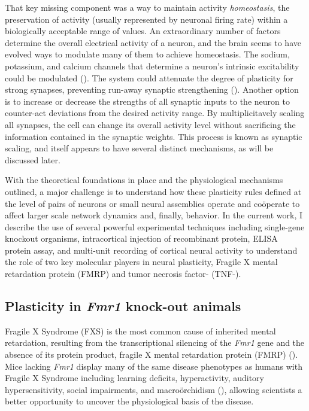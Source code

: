That key missing component was a way to maintain activity \textit{homeostasis}, the preservation of activity (usually represented by neuronal firing rate) within a biologically acceptable range of values. An extraordinary number of factors determine the overall electrical activity of a neuron, and the brain seems to have evolved ways to modulate many of them to achieve homeostasis. The sodium, potassium, and calcium channels that determine a neuron's intrinsic excitability could be modulated (\cite{Franklin1992}). The system could attenuate the degree of plasticity for strong synapses, preventing run-away synaptic strengthening (\cite{VanRossum2000}). Another option is to increase or decrease the strengths of all synaptic inputs to the neuron to counter-act deviations from the desired activity range. By multiplicitavely scaling all synapses, the cell can change its overall activity level without sacrificing the information contained in the synaptic weights. This process is known as synaptic scaling, and itself appears to have several distinct mechanisms, as will be discussed later.

With the theoretical foundations in place and the physiological mechanisms outlined, a major challenge is to understand how these plasticity rules defined at the level of pairs of neurons or small neural assemblies operate and co\"operate to affect larger scale network dynamics and, finally, behavior. In the current work, I describe the use of several powerful experimental techniques including single-gene knockout organisms, intracortical injection of recombinant protein, ELISA protein assay, and multi-unit recording of cortical neural activity to understand the role of two key molecular players in neural plasticity, Fragile X mental retardation protein (FMRP) and tumor necrosis factor-\textalpha{} (TNF-\textalpha{}).

\subsection{Plasticity in \textit{Fmr1} knock-out animals}

Fragile X Syndrome (FXS) is the most common cause of inherited mental retardation, resulting from the transcriptional silencing of the \textit{Fmr1} gene and the absence of its protein product, fragile X mental retardation protein (FMRP) (\cite{Bailey1998, Jin2003}). Mice lacking \textit{Fmr1} display many of the same disease phenotypes as humans with Fragile X Syndrome including learning deficits, hyperactivity, auditory hypersensitivity, social impairments, and macro\"orchidism (\cite{DutchBelgianFragileXConsortium1994, Bernardet2006, Moy2008}), allowing scientists a better opportunity to uncover the physiological basis of the disease.


